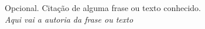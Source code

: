 
\begin{epigrafe}
    \vspace*{\fill}
    \begin{flushright}
        Opcional. Citação de alguma frase ou texto conhecido. \\
        \textit{Aqui vai a autoria da frase ou texto}
    \end{flushright}
\end{epigrafe}
